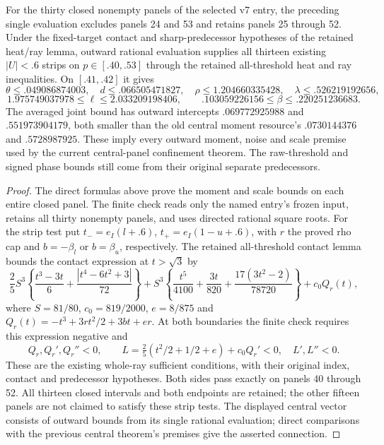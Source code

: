 \begin{proposition}
For the thirty closed nonempty panels of the selected v7 entry, the preceding
single evaluation excludes panels 24 and 53 and retains panels 25 through 52.
Under the fixed-target contact and sharp-predecessor hypotheses of the
retained heat/ray lemma, outward rational evaluation supplies all thirteen existing
$|U|<.6$ strips on $p\in[.40,.53]$ through the retained all-threshold
heat and ray inequalities. On $[.41,.42]$ it gives
\[
 \theta\le.049086874003,\quad d\le.066505471827,\quad
 \rho\le1.204660335428,\quad\lambda\le.526219192656,
\]
\[
 1.975749037978\le\ell\le2.033209198406,
 \qquad .103059226156\le\beta\le.220251236683.
\]
The averaged joint bound has outward intercepts $.069772925988$ and
$.551973904179$, both smaller than the old central moment resource's
$.0730144376$ and $.5728987925$. These imply every outward moment, noise
and scale premise used by the
current central-panel confinement theorem. The raw-threshold and signed
phase bounds still come from their original separate predecessors.
\end{proposition}
\begin{proof}
The direct formulas above prove the moment and scale bounds on each entire
closed panel. The finite check reads only the named entry's frozen input,
retains all thirty nonempty panels, and uses directed rational square roots.
For the strip test put $t_-=e_I(l+.6)$, $t_+=e_I(1-u+.6)$, with $r$ the
proved rho cap and $b=-\beta_l$ or $b=\beta_u$, respectively. The retained
all-threshold contact lemma bounds the contact expression at $t>\sqrt3$ by
\[
 \frac25 S^3\left\{\frac{t^3-3t}{6}
                +\frac{|t^4-6t^2+3|}{72}\right\}
 +S^3\left\{\frac{t^5}{4100}+\frac{3t}{820}
                 +\frac{17(3t^2-2)}{78720}\right\}+c_0Q_r(t),
\]
where $S=81/80$, $c_0=819/2000$, $e=8/875$ and
$Q_r(t)=-t^3+3rt^2/2+3bt+er$. At both boundaries the finite check requires
this expression negative and
\[
 Q_r,Q_r',Q_r''<0,\qquad
 L=\tfrac25(t^2/2+1/2+e)+c_0Q_r'<0,\quad L',L''<0.
\]
These are the existing whole-ray sufficient conditions, with their original
index, contact and predecessor hypotheses. Both sides pass exactly on panels
40 through 52. All thirteen closed intervals and both endpoints are retained;
the other fifteen panels are not claimed to satisfy these strip tests.
The displayed central vector consists of outward bounds from its single
rational evaluation; direct comparisons with the previous central theorem's
premises give the asserted connection.
\end{proof}

